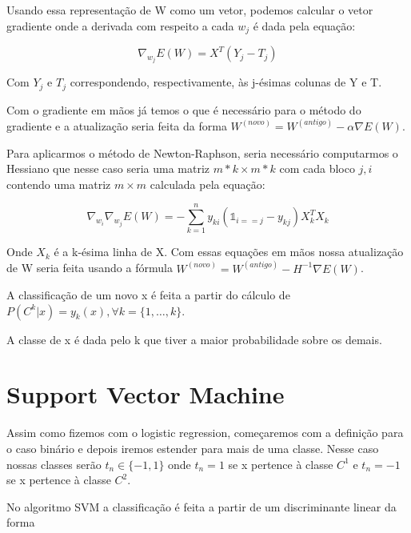 Usando essa representação de W como um vetor, podemos calcular o vetor gradiente onde a derivada
com respeito a cada $w_j$ é dada pela equação:

\begin{center}
	\begin{equation}
		\nabla_{w_j} E(W) = X^T(Y_j - T_j)
	\end{equation}
\end{center}

Com $Y_j$ e $T_j$ correspondendo, respectivamente, às j-ésimas colunas de Y e T.

Com o gradiente em mãos já temos o que é necessário para o método do gradiente e a
atualização seria feita da forma $W^{ (novo) } = W^{ (antigo) } - \alpha \nabla E(W)$.

Para aplicarmos o método de Newton-Raphson, seria necessário computarmos o Hessiano que
nesse caso seria uma matriz $m*k \times m*k$ com cada bloco $j, i$ contendo uma matriz
$m \times m$ calculada pela equação:

\begin{center}
	\begin{equation}
		\nabla_{w_i} \nabla_{w_j} E(W) = - \sum_{k = 1}^n y_{ki}( \mathds{1}_{i == j} - y_{kj})
		X_k^TX_k
	\end{equation}
\end{center} 

Onde $X_k$ é a k-ésima linha de X. Com essas equações em mãos nossa atualização de
W seria feita usando a fórmula $W^{ (novo) } = W^{ (antigo) } - H^{-1}\nabla E(W)$.

A classificação de um novo x é feita a partir
do cálculo de $P(C^k | x) = y_k(x), \forall k = \{1, \ldots, k\}$.

A classe de x é dada pelo k que tiver a maior probabilidade sobre os demais.


\section{Support Vector Machine}

Assim como fizemos com o logistic regression, começaremos com a definição
para o caso binário e depois iremos estender para mais de uma classe. Nesse caso
nossas classes serão $t_n \in \{-1, 1\}$ onde $t_n = 1$ se x pertence à classe $C^1$ e
$t_n = -1$ se x pertence à classe $C^2$.

No algoritmo SVM a classificação é feita a partir de um discriminante linear
da forma 

